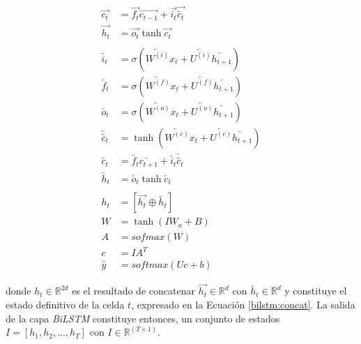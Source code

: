 \begin{align}
  \overrightarrow{c_{t}} &= \overrightarrow{f_{t}}\overrightarrow{c_{t-1}} + \overrightarrow{i_{t}}\overrightarrow{\tilde{c_{t}}} \label{bilstm:cell_state} \\
  \overrightarrow{h_{t}} &= \overrightarrow{o_{t}}\tanh{\overrightarrow{c_{t}}} \label{bilstm:hidden_state}\\
  \nonumber \\
  \overleftarrow{i_{t}} &= \sigma{(\overleftarrow{W^{(i)}} x_{t} + \overleftarrow{U^{(i)}}\overleftarrow{h_{t+1}})} \label{bilstml:ig} \\
  \overleftarrow{f_{t}} &= \sigma{(\overleftarrow{W^{(f)}} x_{t} + \overleftarrow{U^{(f)}}\overleftarrow{h_{t+1}})} \label{bilstml:fg} \\
  \overleftarrow{o_{t}} &= \sigma{(\overleftarrow{W^{(o)}} x_{t} + \overleftarrow{U^{(o)}}\overleftarrow{h_{t+1}})} \label{bilstml:og} \\
  \overleftarrow{\tilde{c_{t}}} &= \tanh(\overleftarrow{W^{(c)}} x_{t} + \overleftarrow{U^{(c)}}\overleftarrow{h_{t+1}}) \label{bilstml:new_memory_cell} \\
  \overleftarrow{c_{t}} &= \overleftarrow{f_{t}}\overleftarrow{c_{t+1}} + \overleftarrow{i_{t}}\overleftarrow{\tilde{c_{t}}} \label{bilstml:cell_state} \\
  \overleftarrow{h_{t}} &= \overleftarrow{o_{t}}\tanh{\overleftarrow{c_{t}}} \label{bilstml:hidden_state}\\
  \nonumber \\
  h_{t} &= [\overrightarrow{h_{t}} \oplus \overleftarrow{h_{t}}] \label{bilstm:concat} \\
  W &= \tanh{(IW_{a} + B)} \label{bilstm:dense} \\
  A &= sofmax(W) \label{bilstm:sig} \\
  c &= IA^{T} \label{bilstm:dot} \\
  \hat{y} &= softmax(Uc + b) \label{bilstm:pred}
\end{align}


donde $h_{t} \in {\mathbb{R}} ^{2d}$ es el resultado de concatenar $\overrightarrow{h_{t}} \in {\mathbb{R}} ^{d}$ con $\overleftarrow{h_{t}} \in {\mathbb{R}} ^{d}$ y constituye el estado definitivo de la celda $t$, expresado en la Ecuación \ref{bilstm:concat}. La salida de la capa \textit{BiLSTM} constituye entonces, un conjunto de estados $I  = {[h_{1}, h_{2}, ..., h_{T}]}$ con $I \in {\mathbb{R}}^{(T \times 1)}$.